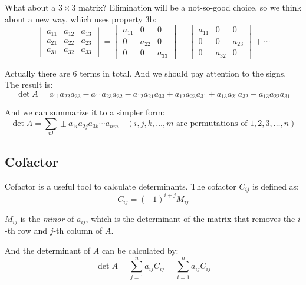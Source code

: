 \documentclass[10pt,a4paper,oneside,numbers=noenddot]{scrbook}
\theoremstyle{ctplain}
\theoremstyle{ctresult}
\begin{document}
What about a $3 \times 3$ matrix? Elimination will be a not-so-good choice, so we
think about a new way, which uses property 3b:
\[
  \begin{vmatrix}
    a_{11} & a_{12} & a_{13} \\
    a_{21} & a_{22} & a_{23} \\
    a_{31} & a_{32} & a_{33}
  \end{vmatrix} =
  \begin{vmatrix}
    a_{11} & 0 & 0 \\
    0 & a_{22} & 0 \\
    0 & 0 & a_{33}
  \end{vmatrix} +
  \begin{vmatrix}
    a_{11} & 0 & 0 \\
    0 & 0 & a_{23} \\
    0 & a_{32} & 0
  \end{vmatrix} +
  \cdots
\]

Actually there are 6 terms in total. And we should pay attention to the signs. The
result is:
\[
  \det A = a_{11}a_{22}a_{33}-a_{11}a_{23}a_{32}-
           a_{12}a_{21}a_{33}+a_{12}a_{23}a_{31}+
           a_{13}a_{21}a_{32}-a_{13}a_{22}a_{31}
\]

And we can summarize it to a simpler form:
\[
  \det A = \sum_{n!}\pm a_{1i}a_{2j}a_{3k} \cdots a_{nm}
  \quad (i, j, k, \ldots, m \text{ are permutations of } 1, 2, 3, \ldots, n)
\]

\subsection{Cofactor}

Cofactor is a useful tool to calculate determinants. The cofactor $C_{ij}$ is defined as:
\[
  C_{ij} = (-1)^{i+j}M_{ij}
\]

$M_{ij}$ is the \emph{minor} of $a_{ij}$, which is the determinant of the matrix that
removes the $i$-th row and $j$-th column of $A$.

And the determinant of $A$ can be calculated by:
\[
  \det A = \sum_{j=1}^{n} a_{ij}C_{ij} = \sum_{i=1}^{n} a_{ij}C_{ij}
\]
\end{document}
